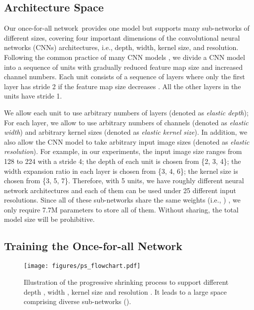 \documentclass{article} \usepackage{iclr2020_conference,times}
\newcommand{\motherNet}{once-for-all network}
\newcommand{\motherNetCap}{Once-for-all Network}
\begin{document}
\subsection{Architecture Space}
Our \motherNet~provides one model but supports many sub-networks of different sizes, covering four important dimensions of the convolutional neural networks (CNNs) architectures, i.e., depth, width, kernel size, and resolution.  
Following the common practice of many CNN models \citep{he2016deep,sandler2018mobilenetv2,huang2017densely}, we divide a CNN model into a sequence of units with gradually reduced feature map size and increased channel numbers. Each unit consists of a sequence of layers where only the first layer has stride 2 if the feature map size decreases \citep{sandler2018mobilenetv2}. All the other layers in the units have stride 1. 

We allow each unit to use arbitrary numbers of layers (denoted as \emph{elastic depth}); For each layer, we allow to use arbitrary numbers of channels (denoted as \emph{elastic width}) and arbitrary kernel sizes (denoted as \emph{elastic kernel size}). In addition, we also allow the CNN model to take arbitrary input image sizes (denoted as \emph{elastic resolution}). For example, in our experiments, the input image size ranges from 128 to 224 with a stride 4; the depth of each unit is chosen from \{2, 3, 4\}; the width expansion ratio in each layer is chosen from \{3, 4, 6\}; the kernel size is chosen from \{3, 5, 7\}. Therefore, with 5 units, we have roughly  different neural network architectures and each of them can be used under 25 different input resolutions. Since all of these sub-networks share the same weights (i.e., ) \citep{Cheung2019superposition}, we only require 7.7M parameters to store all of them. Without sharing, the total model size will be prohibitive.

\subsection{Training the \motherNetCap}
\label{sec:ofa_train}

\begin{figure}[t]
\vspace{-20pt}
    \centering
    \texttt{[image: figures/ps\_flowchart.pdf]}
    \caption{Illustration of the progressive shrinking process to support different depth , width , kernel size  and resolution . It leads to a large space comprising diverse sub-networks ().}\label{fig:algo_flowchart}
\end{figure}
\end{document}
